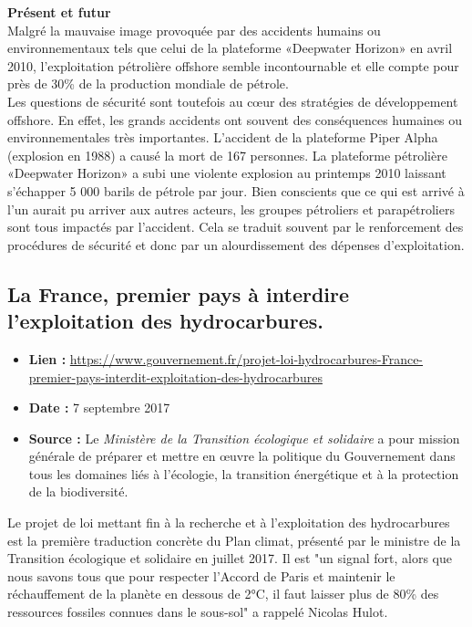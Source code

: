 \documentclass[8pt]{article}
\begin{document}
\textbf{Présent et futur}\\

Malgré la mauvaise image provoquée par des accidents humains ou environnementaux tels que celui de la plateforme «Deepwater Horizon» en avril 2010, l’exploitation pétrolière offshore semble incontournable et elle compte pour près de 30\% de la production mondiale de pétrole.\\

Les questions de sécurité sont toutefois au cœur des stratégies de développement offshore. En effet, les grands accidents ont souvent des conséquences humaines ou environnementales très importantes. L’accident de la plateforme Piper Alpha (explosion en 1988) a causé la mort de 167 personnes. La plateforme pétrolière «Deepwater Horizon»  a subi une violente explosion au printemps 2010 laissant s’échapper 5 000 barils de pétrole par jour. Bien conscients que ce qui est arrivé à l'un aurait pu arriver aux autres acteurs, les groupes pétroliers et parapétroliers sont tous impactés par l’accident. Cela se traduit souvent par le renforcement des procédures de sécurité et donc par un alourdissement des dépenses d'exploitation.

\newpage
\subsection{La France, premier pays à interdire l’exploitation des hydrocarbures.}
\label{sec:interdiction}

\begin{itemize}
	\item \textbf{Lien : }  \url{https://www.gouvernement.fr/projet-loi-hydrocarbures-France-premier-pays-interdit-exploitation-des-hydrocarbures} 
	\item \textbf{Date : }  7 septembre 2017
	\item \textbf{Source : } Le \textit{Ministère de la Transition écologique et solidaire} a pour mission générale de préparer et mettre en œuvre la politique du Gouvernement dans tous les domaines liés à l’écologie, la transition énergétique et à la protection de la biodiversité.
\end{itemize}

Le projet de loi mettant fin à la recherche et à l’exploitation des hydrocarbures est la première traduction concrète du Plan climat, présenté par le ministre de la Transition écologique et solidaire en juillet 2017. Il est "un signal fort, alors que nous savons tous que pour respecter l’Accord de Paris et maintenir le réchauffement de la planète en dessous de 2°C, il faut laisser plus de 80\% des ressources fossiles connues dans le sous-sol" a rappelé Nicolas Hulot.\\
\end{document}
